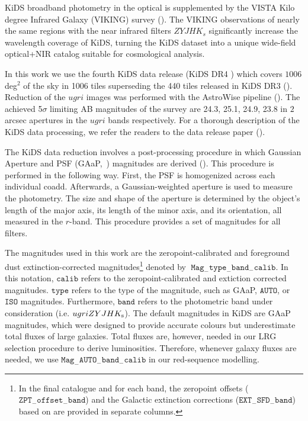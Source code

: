 \documentclass[fleqn,usenatbib,useAMS]{mnras}
\begin{document}
KiDS broadband photometry in the optical is supplemented by the VISTA Kilo degree Infrared Galaxy (VIKING) survey (\citealt{irwin2004,lewis2010,Edge2013,Gonz2018}). The VIKING observations of nearly the same regions with the near infrared filters $ZYJHK_{s}$ significantly increase the wavelength coverage of KiDS, turning the KiDS dataset into a unique wide-field optical+NIR catalog suitable for cosmological analysis.

In this work we use the fourth KiDS data release (KiDS DR4 \citealt{kuijken2019}) which covers $1006$ deg$^{2}$ of the sky in 1006 tiles superseding the 440 tiles released in KiDS DR3 (\citealt{kids_dr3}). Reduction of the $ugri$ images was performed with the AstroWise pipeline (\citealt{omegacam}).  
The achieved 5$\sigma$ limiting AB magnitudes of the survey are 24.3, 25.1, 24.9, 23.8 in $2$ arcsec apertures in the $ugri$ bands respectively. For a thorough description of the KiDS data processing, we refer the readers to the data release paper (\citealt{kuijken2019}). 


The KiDS data reduction involves a post-processing procedure in which Gaussian Aperture and PSF (GAaP,~\citealt{gaap}) magnitudes are derived (\citealt{kuijken2015}). This procedure is performed in the following way. First, the PSF is homogenized across each individual coadd. Afterwards, a Gaussian-weighted aperture is used to measure the photometry. The size and shape of the aperture is determined by the object's length of the major axis, its length of the minor axis, and its orientation, all measured in the $r$-band. This procedure provides a set of magnitudes for all filters. 

The magnitudes used in this work are the zeropoint-calibrated and foreground dust extinction-corrected magnitudes\footnote{In the final catalogue and for each band, the zeropoint offsets ($\mathtt{ZPT}_{-}\mathtt{offset}_{-}\mathtt{band}$) and the Galactic extinction corrections ($\mathtt{EXT}_{-}\mathtt{SFD}_{-}\mathtt{band}$) based on \citet{schlegel98} are provided in separate columns.} 
denoted by $\; \mathtt{Mag}_{-}\mathtt{type}_{-}\mathtt{band}_{-}\mathtt{calib}$. 
In this notation, $\mathtt{calib}$ refers to the zeropoint-calibrated and extiction corrected magnitudes. $\mathtt{type}$ refers to the type of the magnitude, such as GAaP, $\mathtt{AUTO}$, or $\mathtt{ISO}$ magnitudes. Furthermore, $\mathtt{band}$ refers to the photometric band under consideration (i.e. $ugriZYJHK_{\rm s}$). The default magnitudes in KiDS are GAaP magnitudes, which were designed to provide accurate colours but underestimate total fluxes of large galaxies. Total fluxes are, however, needed in our LRG selection procedure to derive luminosities. Therefore, whenever galaxy fluxes are needed, we use $\mathtt{Mag}_{-}\mathtt{AUTO}_{-}\mathtt{band}_{-}\mathtt{calib}$ in our red-sequence modelling. 
\end{document}
